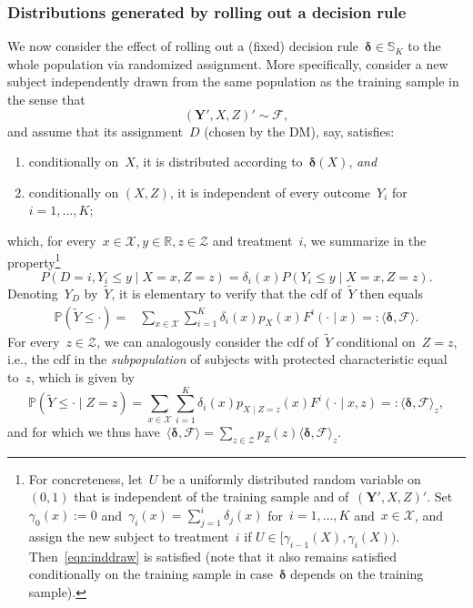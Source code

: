 \documentclass[11pt, a4paper]{article}
\newcommand{\R}{\mathbb{R}}
\theoremstyle{definition}
\begin{document}
\subsubsection{Distributions generated by rolling out a decision rule}\label{ssec:distrroll}

We now consider the effect of rolling out a (fixed) decision rule~$\bm{\delta} \in \mathbb{S}_K$ to the whole population via randomized assignment. More specifically, consider a new subject independently drawn from the same population as the training sample in the sense that
%
\begin{equation}\label{eqn:rollo}
(\bm{Y}', X, Z)' \sim \mathcal{F},
\end{equation} 
%
and assume that its assignment~$D$ (chosen by the DM), say, satisfies:
\begin{enumerate}
	\item conditionally on~$X$, it is distributed according to~$\bm{\delta}(X)$, \emph{and}
	\item  conditionally on $(X, Z)$, it is independent of every outcome~$Y_{i}$ for~$i = 1, \hdots, K$;
\end{enumerate}
%
which, for every~$x \in \mathcal{X}, y \in \R, z \in \mathcal{Z}$ and treatment~$i$, we summarize in the property\footnote{\label{foot:concrass}For concreteness, let~$U$ be a uniformly distributed random variable on~$(0, 1)$ that is independent of the training sample and of~$(\bm{Y}', X, Z)'$. Set~$\gamma_{0}(x) := 0$ and~$\gamma_{i}(x) = \sum_{j = 1}^i\delta_{j}(x)$ for~$i = 1, \hdots, K$ and~$x \in \mathcal{X}$, and assign the new subject to treatment~$i$ if $U \in [\gamma_{i-1}(X),  \gamma_i(X)).$ Then~\eqref{eqn:inddraw} is satisfied (note that it also remains satisfied conditionally on the training sample in case~$\bm{\delta}$ depends on the training sample).}
\begin{equation}\label{eqn:inddraw}
P(D = i, Y_i \leq y \mid X = x, Z = z) = \delta_i(x) P(Y_i \leq y \mid X = x, Z = z).
\end{equation} 
Denoting~$Y_D$ by~$\tilde{Y}$, it is elementary to verify that the cdf of~$\tilde{Y}$ then equals
\begin{equation}\label{eqn:mixroll}
\begin{aligned}
\mathbb{P}\left(\tilde{Y} \leq \cdot\right) 
=  &\sum_{x \in \mathcal{X}}  \sum_{i = 1}^K \delta_i(x) p_X(x) F^i(\cdot\mid x)  =: \langle \bm{\delta}, \mathcal{F} \rangle.
\end{aligned}
\end{equation}
For every~$z \in \mathcal{Z}$, we can analogously consider the cdf of~$\tilde{Y}$ conditional on~$Z = z$, i.e., the cdf in the \emph{subpopulation} of subjects with protected characteristic equal to~$z$, which is given by 
\begin{equation}\label{eqn:mixrollsub}
\mathbb{P}\left(\tilde{Y} \leq \cdot \mid Z = z\right) =  \sum_{x \in \mathcal{X}} \sum_{i = 1}^K \delta_i(x) p_{X \mid  Z = z}(x) F^i(\cdot\mid x, z) =: \langle \bm{\delta}, \mathcal{F} \rangle_z,
\end{equation}
%
and for which we thus have~$\langle \bm{\delta}, \mathcal{F} \rangle = \sum_{z \in \mathcal{Z}} p_Z(z) \langle \bm{\delta}, \mathcal{F} \rangle_z$.
\end{document}
